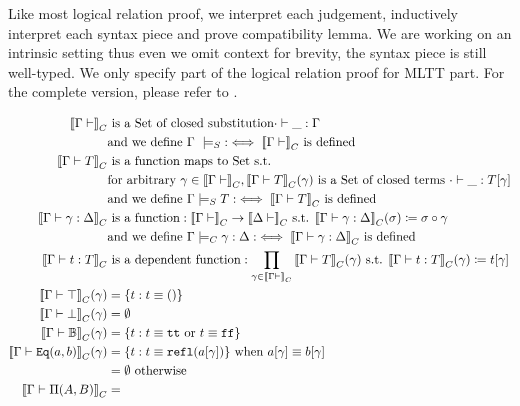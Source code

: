 Like most logical relation proof,  we interpret each judgement, inductively interpret each syntax piece and prove compatibility lemma. We are working on an intrinsic setting thus even we omit context for brevity, the syntax piece is still well-typed. We only specify part of the logical relation proof for MLTT part. For the complete version, please refer to \citet{kaposi2019gluing, coquand2018canonicity,sterling2019algebraic}.

\begin{align*}
  \denotesC{\goodCtx{\Gm}{i}} & \text{ is a Set of closed substitution} \goodSub{\cdot}{\_}{\Gm} \\
  &\text{and we define } \goodCtxS{\Gm}{i} :\iff \denotesC{\goodCtx{\Gm}{i}} \text{ is defined} \\
  \denotesC{\goodType{\Gm}{T}{}} & \text{ is a function maps to Set s.t.} \\
  & \text{for arbitrary } \gm \in \denotesC{\goodCtx{\Gm}{}}, \denotesC{\goodType{\Gm}{T}{}}(\gm) \text{ is a Set of closed terms } \goodTerm{\cdot}{\_}{\sub{T}{\gm}} \\ 
  &\text{and we define } \goodTypeS{\Gm}{T}{i} : \iff \denotesC{\goodType{\Gm}{T}{i}} \text{ is defined } \\ 
  \denotesC{\goodSub{\Gm}{\gm}{\Delta}} & \text{ is a function}: \denotesC{\goodCtx{\Gm}{i}} \to \denotesC{\goodCtx{\Delta}{i}} \text{ s.t. } \denotesC{\goodSub{\Gm}{\gm}{\Delta}}(\sigma) \coloneqq \SubstComp{\sigma}{\gm} \\
  &\text{and we define } \goodSubC{\Gm}{\gm}{\Delta} :\iff \denotesC{\goodSub{\Gm}{\gm}{\Delta}} \text{ is defined} \\
  \denotesC{\goodTerm{\Gm}{t}{T}} & \text{ is a dependent function}: \prod_{\gm \in \denotesC{\goodCtx{\Gm}{i}}}\denotesC{\goodType{\Gm}{T}{}}(\gm)  \text{ s.t. } \denotesC{\goodTerm{\Gm}{t}{T}}(\gm) \coloneqq \sub{t}{\gm} \\
  \denotesC{\goodType{\Gm}{\top}{}}(\gm) &= \{t : t \equiv \unit \} \\
  \denotesC{\goodType{\Gm}{\bot}{}}(\gm) &= \emptyset \\
  \denotesC{\goodType{\Gm}{\cB}{}}(\gm) &= \{t : t \equiv \true \text{ or } t \equiv\false \} \\
  \denotesC{\goodType{\Gm}{\TyId{a}{b}}{}}(\gm) &= \{t : t \equiv \eqrefl{\sub{a}{\gm}} \} \text{ when } \sub{a}{\gm} \equiv \sub{b}{\gm} \\ 
  &= \emptyset \text{ otherwise } \\ 
  \denotesC{\goodType{\Gm}{\TyPi{A}{B}}{}} &= \\

\end{align*}
